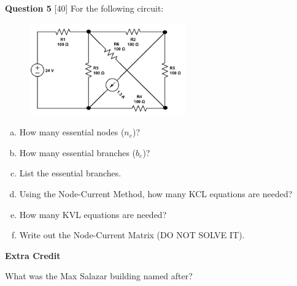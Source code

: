 \documentclass[12pt]{article}
\begin{document}
{\bf Question 5} [40]
\newline
For the following circuit:

\begin{figure}[h!]
\centering 
\includegraphics[clip,width=0.6\textwidth]{mid1_5.jpg}
\end{figure}



\begin{enumerate}[(a)]
\item How many essential nodes ($n_e$)?
\item How many essential branches ($b_e$)?
\item List the essential branches.
\item Using the Node-Current Method, how many KCL equations are needed?
\item How many KVL equations are needed?
\item Write out the Node-Current Matrix (DO NOT SOLVE IT).

\end{enumerate}

{\bf Extra Credit}

What was the Max Salazar building named after?
\end{document}
